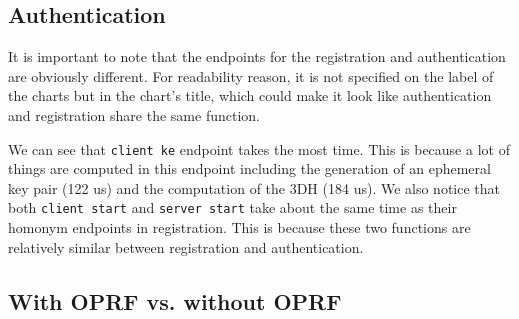 \documentclass[../report.tex]{subfiles}
\begin{document}
\subsection*{Authentication}
It is important to note that the endpoints for the registration and authentication are obviously different. For readability reason, it is not specified on the label of the charts but in the chart's title, which could make it look like authentication and registration share the same function.

We can see that \verb|client ke| endpoint takes the most time. This is because a lot of things are computed in this endpoint including the generation of an ephemeral key pair (122 us) and the computation of the 3DH (184 us).
We also notice that both \verb|client start| and \verb|server start| take about the same time as their homonym endpoints in registration. This is because these two functions are relatively similar between registration and authentication.





\subsection{With OPRF vs. without OPRF} \label{sec:oprf_performances} %
\end{document}
